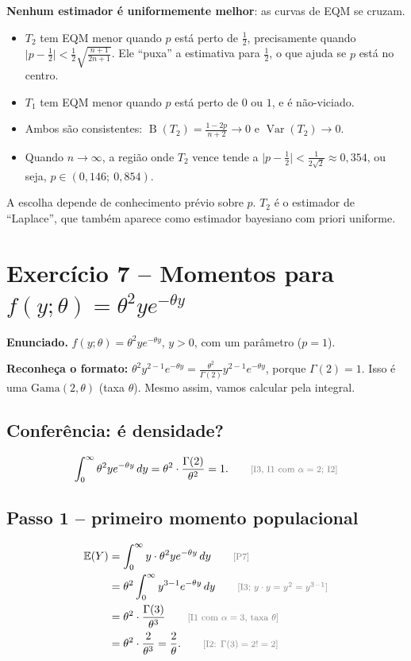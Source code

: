 \documentclass[11pt,a4paper]{article}
\newcommand{\E}{\mathbb{E}}
\newcommand{\Var}{\operatorname{Var}}
\newcommand{\B}{\operatorname{B}}
\newcommand{\just}[1]{\tag*{\footnotesize\textcolor{gray}{[#1]}}}
\begin{document}
\begin{resposta}
\textbf{Nenhum estimador é uniformemente melhor}: as curvas de EQM se cruzam.
\begin{itemize}[leftmargin=1.2em]
\item $T_2$ tem EQM menor quando $p$ está perto de $\frac12$, precisamente quando $\big|p-\frac12\big|<\frac12\sqrt{\frac{n+1}{2n+1}}$. Ele ``puxa'' a estimativa para $\frac12$, o que ajuda se $p$ está no centro.
\item $T_1$ tem EQM menor quando $p$ está perto de $0$ ou $1$, e é não-viciado.
\item Ambos são consistentes: $\B(T_2)=\frac{1-2p}{n+2}\to0$ e $\Var(T_2)\to0$.
\item Quando $n\to\infty$, a região onde $T_2$ vence tende a $\big|p-\frac12\big|<\frac{1}{2\sqrt2}\approx0{,}354$, ou seja, $p\in(0{,}146;\ 0{,}854)$.
\end{itemize}
A escolha depende de conhecimento prévio sobre $p$. $T_2$ é o estimador de ``Laplace'', que também aparece como estimador bayesiano com priori uniforme.
\end{resposta}

\section{Exercício 7 -- Momentos para $f(y;\theta)=\theta^2ye^{-\theta y}$}

\textbf{Enunciado.} $f(y;\theta)=\theta^2ye^{-\theta y}$, $y>0$, com um parâmetro ($p=1$).

\begin{ideia}
\textbf{Reconheça o formato:} $\theta^2y^{2-1}e^{-\theta y}=\frac{\theta^2}{\Gamma(2)}y^{2-1}e^{-\theta y}$, porque $\Gamma(2)=1$. Isso é uma $\text{Gama}(2,\theta)$ (taxa $\theta$). Mesmo assim, vamos calcular pela integral.
\end{ideia}

\subsection*{Conferência: é densidade?}
\[
\int_0^\infty\theta^2ye^{-\theta y}\,dy=\theta^2\cdot\frac{\Gamma(2)}{\theta^2}=1 . \just{I3, I1 com $\alpha=2$; I2}
\]

\subsection*{Passo 1 -- primeiro momento populacional}
\begin{align*}
\E(Y)&=\int_0^\infty y\cdot\theta^2ye^{-\theta y}\,dy \just{P7}\\
&=\theta^2\int_0^\infty y^{3-1}e^{-\theta y}\,dy \just{I3; $y\cdot y=y^2=y^{3-1}$}\\
&=\theta^2\cdot\frac{\Gamma(3)}{\theta^3} \just{I1 com $\alpha=3$, taxa $\theta$}\\
&=\theta^2\cdot\frac{2}{\theta^3}=\frac{2}{\theta}. \just{I2: $\Gamma(3)=2!=2$}
\end{align*}
\end{document}
